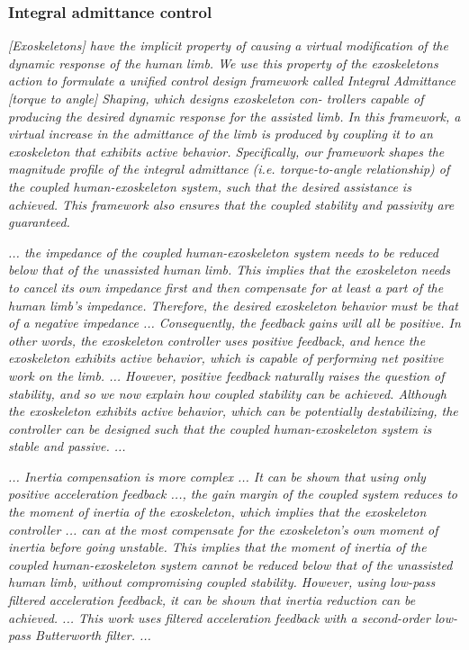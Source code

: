 \documentclass[letterpaper,12pt,fullpage]{article}
\begin{document}
\subsubsection{Integral admittance control}

{\it [Exoskeletons] have the implicit property
of causing a virtual modification of the dynamic response of
the human limb. We use this property of the exoskeletons
action to formulate a unified control design framework called
Integral Admittance [torque to angle] Shaping, which designs exoskeleton con-
trollers capable of producing the desired dynamic response
for the assisted limb. In this framework, a virtual increase
in the admittance of the limb is produced by coupling it
to an exoskeleton that exhibits active behavior. Specifically,
our framework shapes the magnitude profile of the integral
admittance (i.e. torque-to-angle relationship) of the coupled
human-exoskeleton system, such that the desired assistance is
achieved. This framework also ensures that the coupled stability
and passivity are guaranteed.}~\cite{Nagarajan_etal_2015}

{\it ... the impedance of the coupled human-exoskeleton
system needs to be reduced below that of the unassisted
human limb. This implies that the exoskeleton needs to
cancel its own impedance first and then compensate for
at least a part of the human limb’s impedance. Therefore,
the desired exoskeleton behavior must be that of a negative
impedance ... Consequently,
the feedback gains will all be
positive. In other words, the exoskeleton controller uses
positive feedback, and hence the exoskeleton exhibits active
behavior, which is capable of performing net positive work
on the limb. ...
However, positive feedback naturally raises the question of
stability, and so we now explain how coupled stability can be
achieved. Although the exoskeleton exhibits active behavior,
which can be potentially destabilizing, the controller can be
designed such that the coupled human-exoskeleton system
is stable and passive. ... 
}~\cite{Nagarajan_etal_2015}

{\it
... Inertia compensation is more complex ...
It can be shown that using only positive acceleration
feedback ..., the gain margin of the coupled system
reduces to the moment of inertia of the exoskeleton, which
implies that the exoskeleton controller ... can at the most
compensate for the exoskeleton’s own moment of inertia
before going unstable. This implies that the moment of
inertia of the coupled human-exoskeleton system cannot be
reduced below that of the unassisted human limb, without
compromising coupled stability. However, using low-pass
filtered acceleration feedback, it can be shown that inertia 
reduction can be achieved. ...
This work uses filtered acceleration
feedback with a second-order low-pass Butterworth filter. ...
}~\cite{Nagarajan_etal_2015}
\end{document}
